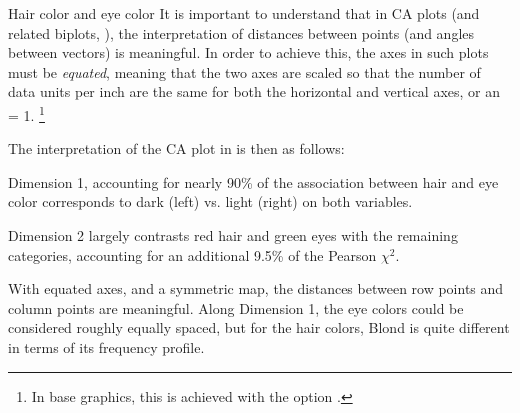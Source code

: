 \documentclass[11pt]{book}
\begin{document}
\begin{Example}[haireye3]{Hair color and eye color}
It is important to understand that in CA plots (and related biplots, ),
the interpretation of distances between points (and angles between vectors)
is meaningful.  In order to achieve this, the axes in such plots must be \emph{equated},
meaning that the two axes are scaled so that the number of data units per inch
are the same for both the horizontal and vertical axes, or an  = 1.%
\footnote{
In base \R graphics, this is achieved with the  option .
}

The interpretation of the CA plot in  is then as follows:
\begin{itemize*}
 \item Dimension 1, accounting for nearly 90\% of the association between
 hair and eye color corresponds to dark (left) vs. light (right) on both variables.
 \item Dimension 2 largely contrasts red hair and green eyes with the remaining categories, accounting for an additional 9.5\% of the Pearson $\chi^2$.
 \item With equated axes, and a symmetric map, the distances between row points and
 column points are meaningful.  Along Dimension 1, the eye colors could be considered
 roughly equally spaced, but for the hair colors, Blond is quite different in terms
 of its frequency profile.
\end{itemize*}
\end{Example}
\end{document}
